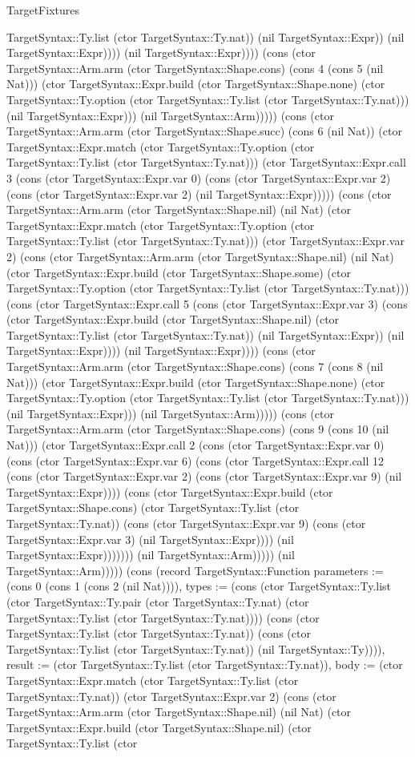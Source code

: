 \begin{lexlean}{TargetFixtures}
\begin{semanticmodule}
{TargetSyntax::Ty.list (ctor TargetSyntax::Ty.nat)) (nil TargetSyntax::Expr)) (nil TargetSyntax::Expr)))) (nil TargetSyntax::Expr)))) (cons (ctor TargetSyntax::Arm.arm (ctor TargetSyntax::Shape.cons) (cons 4 (cons 5 (nil Nat))) (ctor TargetSyntax::Expr.build (ctor TargetSyntax::Shape.none) (ctor TargetSyntax::Ty.option (ctor TargetSyntax::Ty.list (ctor TargetSyntax::Ty.nat))) (nil TargetSyntax::Expr))) (nil TargetSyntax::Arm))))) (cons (ctor TargetSyntax::Arm.arm (ctor TargetSyntax::Shape.succ) (cons 6 (nil Nat)) (ctor TargetSyntax::Expr.match (ctor TargetSyntax::Ty.option (ctor TargetSyntax::Ty.list (ctor TargetSyntax::Ty.nat))) (ctor TargetSyntax::Expr.call 3 (cons (ctor TargetSyntax::Expr.var 0) (cons (ctor TargetSyntax::Expr.var 2) (cons (ctor TargetSyntax::Expr.var 2) (nil TargetSyntax::Expr))))) (cons (ctor TargetSyntax::Arm.arm (ctor TargetSyntax::Shape.nil) (nil Nat) (ctor TargetSyntax::Expr.match (ctor TargetSyntax::Ty.option (ctor TargetSyntax::Ty.list (ctor TargetSyntax::Ty.nat))) (ctor TargetSyntax::Expr.var 2) (cons (ctor TargetSyntax::Arm.arm (ctor TargetSyntax::Shape.nil) (nil Nat) (ctor TargetSyntax::Expr.build (ctor TargetSyntax::Shape.some) (ctor TargetSyntax::Ty.option (ctor TargetSyntax::Ty.list (ctor TargetSyntax::Ty.nat))) (cons (ctor TargetSyntax::Expr.call 5 (cons (ctor TargetSyntax::Expr.var 3) (cons (ctor TargetSyntax::Expr.build (ctor TargetSyntax::Shape.nil) (ctor TargetSyntax::Ty.list (ctor TargetSyntax::Ty.nat)) (nil TargetSyntax::Expr)) (nil TargetSyntax::Expr)))) (nil TargetSyntax::Expr)))) (cons (ctor TargetSyntax::Arm.arm (ctor TargetSyntax::Shape.cons) (cons 7 (cons 8 (nil Nat))) (ctor TargetSyntax::Expr.build (ctor TargetSyntax::Shape.none) (ctor TargetSyntax::Ty.option (ctor TargetSyntax::Ty.list (ctor TargetSyntax::Ty.nat))) (nil TargetSyntax::Expr))) (nil TargetSyntax::Arm))))) (cons (ctor TargetSyntax::Arm.arm (ctor TargetSyntax::Shape.cons) (cons 9 (cons 10 (nil Nat))) (ctor TargetSyntax::Expr.call 2 (cons (ctor TargetSyntax::Expr.var 0) (cons (ctor TargetSyntax::Expr.var 6) (cons (ctor TargetSyntax::Expr.call 12 (cons (ctor TargetSyntax::Expr.var 2) (cons (ctor TargetSyntax::Expr.var 9) (nil TargetSyntax::Expr)))) (cons (ctor TargetSyntax::Expr.build (ctor TargetSyntax::Shape.cons) (ctor TargetSyntax::Ty.list (ctor TargetSyntax::Ty.nat)) (cons (ctor TargetSyntax::Expr.var 9) (cons (ctor TargetSyntax::Expr.var 3) (nil TargetSyntax::Expr)))) (nil TargetSyntax::Expr))))))) (nil TargetSyntax::Arm))))) (nil TargetSyntax::Arm))))}) (cons (record TargetSyntax::Function {parameters := (cons 0 (cons 1 (cons 2 (nil Nat)))), types := (cons (ctor TargetSyntax::Ty.list (ctor TargetSyntax::Ty.pair (ctor TargetSyntax::Ty.nat) (ctor TargetSyntax::Ty.list (ctor TargetSyntax::Ty.nat)))) (cons (ctor TargetSyntax::Ty.list (ctor TargetSyntax::Ty.nat)) (cons (ctor TargetSyntax::Ty.list (ctor TargetSyntax::Ty.nat)) (nil TargetSyntax::Ty)))), result := (ctor TargetSyntax::Ty.list (ctor TargetSyntax::Ty.nat)), body := (ctor TargetSyntax::Expr.match (ctor TargetSyntax::Ty.list (ctor TargetSyntax::Ty.nat)) (ctor TargetSyntax::Expr.var 2) (cons (ctor TargetSyntax::Arm.arm (ctor TargetSyntax::Shape.nil) (nil Nat) (ctor TargetSyntax::Expr.build (ctor TargetSyntax::Shape.nil) (ctor TargetSyntax::Ty.list (ctor }
\end{semanticmodule}
\end{lexlean}
